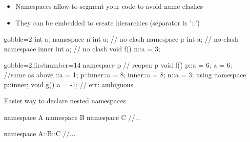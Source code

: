 \begin{frame}[fragile]
\begin{multicols}{2}

  \end{multicols}
\end{frame}

\begin{frame}[fragile]
  \begin{itemize}
  \item Namespaces allow to segment your code to avoid name clashes
  \item They can be embedded to create hierarchies (separator is '::')
  \end{itemize}
  \begin{multicols}{2}
    \begin{cppcode*}{gobble=2}
      int a;
      namespace n {
        int a;   // no clash
      }
      namespace p {
        int a;   // no clash
        namespace inner {
          int a; // no clash
        }
      }
      void f() {
        n::a = 3;
      }
    \end{cppcode*}
    \columnbreak
    \begin{cppcode*}{gobble=2,firstnumber=14}
      namespace p { // reopen p
        void f() {
          p::a = 6;
          a = 6;  //same as above
          ::a = 1;
          p::inner::a = 8;
          inner::a = 8;
          n::a = 3;
        }
      }
      using namespace p::inner;
      void g() {
        a = -1; // err: ambiguous
      }
  \end{cppcode*}
  \end{multicols}
\end{frame}

\begin{frame}[fragile]
  Easier way to declare nested namespaces
  \begin{alertblock}{}
    \begin{cppcode*}{}
      namespace A {
        namespace B {
          namespace C {
            //...
          }
        }
      }
    \end{cppcode*}
  \end{alertblock}
  \begin{exampleblock}{}
    \begin{cppcode*}{}
      namespace A::B::C {
        //...
      }
    \end{cppcode*}
  \end{exampleblock}
\end{frame}

